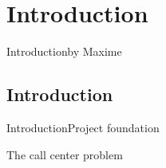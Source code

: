 \section{Introduction}
\begin{frame}{Introduction}{by Maxime}
\small
{}	
\end{frame}

\subsection{Introduction}
\begin{frame}{Introduction}{Project foundation}
	\begin{center}
	The call center problem 
	\end{center}
\end{frame}


